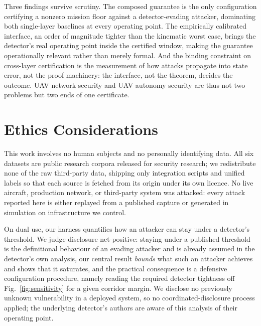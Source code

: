 Three findings survive scrutiny. The composed guarantee is the only
configuration certifying a nonzero mission floor against a detector-evading
attacker, dominating both single-layer baselines at every operating point. The
empirically calibrated interface, an order of magnitude tighter than the
kinematic worst case, brings the detector's real operating point inside the
certified window, making the guarantee operationally relevant rather than merely
formal. And the binding constraint on cross-layer certification is the
measurement of how attacks propagate into state error, not the proof machinery:
the interface, not the theorem, decides the outcome. UAV network security and
UAV autonomy security are thus not two problems but two ends of one
certificate.

\section{Ethics Considerations}
\label{sec:ethics}
This work involves no human subjects and no personally identifying data. All six
datasets are public research corpora released for security research; we
redistribute none of the raw third-party data, shipping only integration scripts
and unified labels so that each source is fetched from its origin under its own
licence. No live aircraft, production network, or third-party system was
attacked: every attack reported here is either replayed from a published capture
or generated in simulation on infrastructure we control.

On dual use, our harness quantifies how an attacker can stay under a detector's
threshold. We judge disclosure net-positive: staying under a published threshold
is the definitional behaviour of an evading attacker and is already assumed in
the detector's own analysis, our central result \emph{bounds} what such an
attacker achieves and shows that it saturates, and the practical consequence is
a defensive configuration procedure, namely reading the required detector
tightness off Fig.~\ref{fig:sensitivity} for a given corridor margin. We
disclose no previously unknown vulnerability in a deployed system, so no
coordinated-disclosure process applied; the underlying detector's authors are
aware of this analysis of their operating point.

